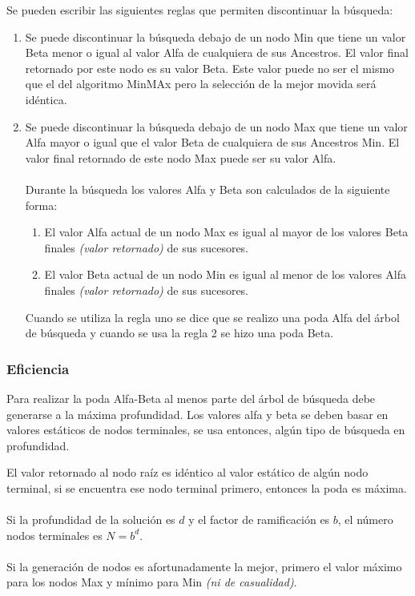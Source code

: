 \documentclass[tikz,11pt,fleqn]{book} %
\begin{document}
Se pueden escribir las siguientes reglas que permiten discontinuar la búsqueda:
\begin{enumerate}
    \item Se puede discontinuar la búsqueda debajo de un nodo Min que tiene un valor Beta menor o igual al valor Alfa de cualquiera de sus Ancestros. El valor final retornado por este nodo es su valor Beta. Este valor puede no ser el mismo que el del algoritmo MinMAx pero la selección de la mejor movida será idéntica.

    \item Se puede discontinuar la búsqueda debajo de un nodo Max que tiene un valor Alfa mayor o igual que el valor Beta de cualquiera de sus Ancestros Min. El valor final retornado de este nodo Max puede ser su valor Alfa.
    \\\\
    Durante la búsqueda los valores Alfa y Beta son calculados de la siguiente forma:
    \begin{enumerate}
        \item El valor Alfa actual de un nodo Max es igual al mayor de los valores Beta finales \textit{(valor retornado)} de sus sucesores.
        \item El valor Beta actual de un nodo Min es igual al menor de los valores Alfa finales \textit{(valor retornado)} de sus sucesores.
    \end{enumerate}
    \vspace{10pt}
    Cuando se utiliza la regla uno se dice que se realizo una poda Alfa del árbol de búsqueda y cuando se usa la regla 2 se hizo una poda Beta.
\end{enumerate}

\subsubsection{Eficiencia}
Para realizar la poda Alfa-Beta al menos parte del árbol de búsqueda debe generarse a la máxima profundidad. Los valores alfa y beta se deben basar en valores estáticos de nodos terminales, se usa entonces, algún tipo de búsqueda en profundidad.

El valor retornado al nodo raíz es idéntico al valor estático de algún nodo terminal, si se encuentra ese nodo terminal primero, entonces la poda es máxima.
\\\\
Si la profundidad de la solución es $d$ y el factor de ramificación es $b$, el número nodos terminales es $N=b^d$.
\\\\
Si la generación de nodos es afortunadamente la mejor, primero el valor máximo para los nodos Max y mínimo para Min \textit{(ni de casualidad)}.
\end{document}
